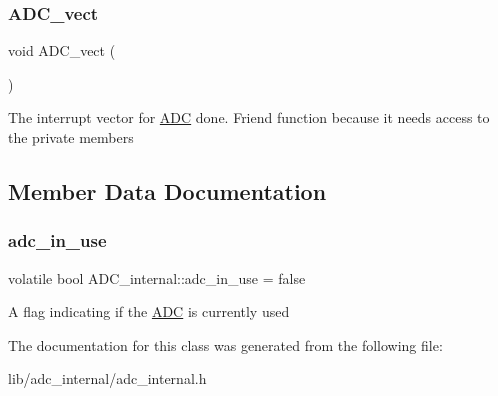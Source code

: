 \subsubsection{\texorpdfstring{A\+D\+C\+\_\+vect}{ADC\_vect}}
{\footnotesize\ttfamily void A\+D\+C\+\_\+vect (\begin{DoxyParamCaption}{ }\end{DoxyParamCaption})\hspace{0.3cm}{\ttfamily [friend]}}

The interrupt vector for \hyperlink{class_a_d_c}{A\+DC} done. Friend function because it needs access to the private members 

\subsection{Member Data Documentation}
\hypertarget{class_a_d_c__internal_a7313da9fa620eae7be708a58d35dbe71}{}\label{class_a_d_c__internal_a7313da9fa620eae7be708a58d35dbe71} 
\subsubsection{\texorpdfstring{adc\+\_\+in\+\_\+use}{adc\_in\_use}}
{\footnotesize\ttfamily volatile bool A\+D\+C\+\_\+internal\+::adc\+\_\+in\+\_\+use = false\hspace{0.3cm}{\ttfamily [private]}}

A flag indicating if the \hyperlink{class_a_d_c}{A\+DC} is currently used 

The documentation for this class was generated from the following file\+:\begin{DoxyCompactItemize}
\item 
lib/adc\+\_\+internal/adc\+\_\+internal.\+h\end{DoxyCompactItemize}
